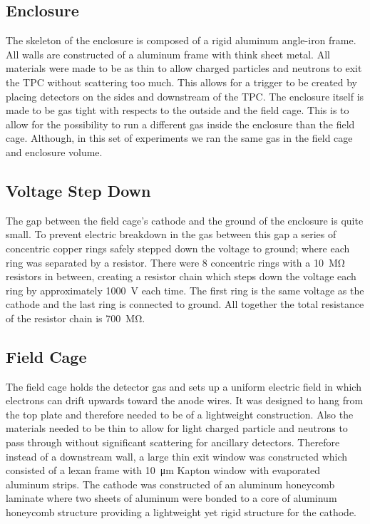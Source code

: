 \subsection{Enclosure}
The skeleton of the enclosure is composed of a rigid aluminum angle-iron frame. All walls are constructed of a aluminum frame with think sheet metal. All materials were made to be as thin to allow charged particles and neutrons to exit the TPC without scattering too much. This allows for a trigger to be created by placing detectors on the sides and downstream of the TPC. The enclosure itself is made to be gas tight with respects to the outside and the field cage. This is to allow for the possibility to run a different gas inside the enclosure than the field cage. Although, in this set of experiments we ran the same gas in the field cage and enclosure volume. 

\subsection{Voltage Step Down}
The gap between the field cage's cathode and the ground of the enclosure is quite small. To prevent electric breakdown in the gas between this gap a series of concentric copper rings safely stepped down the voltage to ground; where each ring was separated by a resistor. There were 8 concentric rings with a \SI{10}{\mega\ohm} resistors in between, creating a resistor chain which steps down the voltage each ring by approximately \SI{1000}{\volt} each time. The first ring is the same voltage as the cathode and the last ring is connected to ground. All together the total resistance of the resistor chain is \SI{700}{\mega\ohm}.

\subsection{Field Cage}

The field cage holds the detector gas and sets up a uniform electric field in which electrons can drift upwards toward the anode wires. It was designed to hang from the top plate and therefore needed to be of a lightweight construction. Also the materials needed to be thin to allow for light charged particle and neutrons to pass through without significant scattering for ancillary detectors. Therefore instead of a downstream wall, a large thin exit window was constructed which consisted of a lexan frame with \SI{10}{\micro\metre} Kapton window with evaporated aluminum strips. The cathode was constructed of an aluminum honeycomb laminate where two sheets of aluminum were bonded to a core of aluminum honeycomb structure providing a lightweight yet rigid structure for the cathode. 

